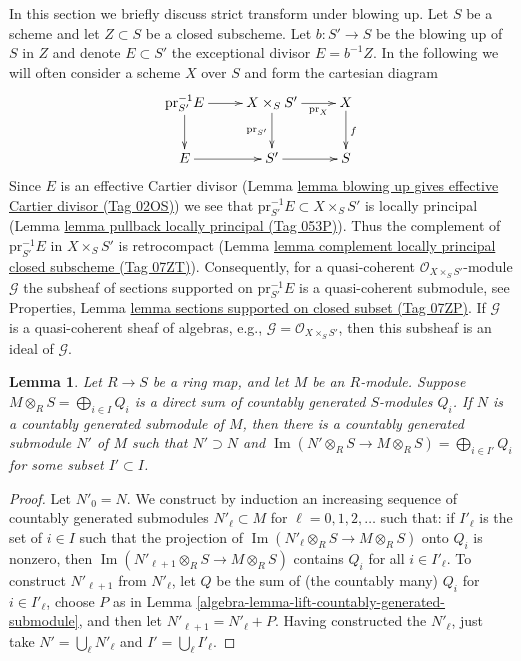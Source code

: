 \documentclass{amsart}
\theoremstyle{plain}
\newtheorem{lemma}[subsection]{Lemma}
\theoremstyle{definition}
\theoremstyle{remark}
\numberwithin{equation}{subsection}
\def\Im{\mathop{\mathrm{Im}}}
\begin{document}
\label{divisors-section-strict-transform}

\noindent
In this section we briefly discuss strict transform under blowing up.
Let $S$ be a scheme and let $Z \subset S$ be a closed subscheme.
Let $b : S' \to S$ be the blowing up of $S$ in $Z$ and denote $E \subset S'$
the exceptional divisor $E = b^{-1}Z$. In the following we will often
consider a scheme $X$ over $S$ and form the cartesian diagram
$$
\xymatrix{
\text{pr}_{S'}^{-1}E \ar[r] \ar[d] &
X \times_S S' \ar[r]_-{\text{pr}_X} \ar[d]_{\text{pr}_{S'}} &
X \ar[d]^f \\
E \ar[r] & S' \ar[r] & S
}
$$
Since $E$ is an effective Cartier divisor
(Lemma \href{https://stacks.math.columbia.edu/tag/02OS}{lemma blowing up gives effective Cartier divisor (Tag 02OS)})
we see that $\text{pr}_{S'}^{-1}E \subset X \times_S S'$
is locally principal
(Lemma \href{https://stacks.math.columbia.edu/tag/053P}{lemma pullback locally principal (Tag 053P)}).
Thus the complement of $\text{pr}_{S'}^{-1}E$ in $X \times_S S'$
is retrocompact
(Lemma \href{https://stacks.math.columbia.edu/tag/07ZT}{lemma complement locally principal closed subscheme (Tag 07ZT)}).
Consequently, for a quasi-coherent $\mathcal{O}_{X \times_S S'}$-module
$\mathcal{G}$ the subsheaf of sections supported on $\text{pr}_{S'}^{-1}E$
is a quasi-coherent submodule, see
Properties, Lemma \href{https://stacks.math.columbia.edu/tag/07ZP}{lemma sections supported on closed subset (Tag 07ZP)}.
If $\mathcal{G}$ is a quasi-coherent sheaf of algebras, e.g.,
$\mathcal{G} = \mathcal{O}_{X \times_S S'}$, then this subsheaf is an ideal
of $\mathcal{G}$.


\begin{lemma}
\label{algebra-lemma-adapted-submodule}
Let $R \to S$ be a ring map, and let $M$ be an $R$-module.  Suppose $M
\otimes_R S = \bigoplus_{i \in I} Q_i$ is a direct sum of countably generated
$S$-modules $Q_i$.  If $N$ is a countably generated submodule of $M$, then
there is a countably generated submodule $N'$ of $M$ such that $N' \supset N$
and $\Im(N' \otimes_R S \to M \otimes_R S) =
\bigoplus_{i \in I'} Q_i$ for some subset $I' \subset I$.
\end{lemma}

\begin{proof}
Let $N'_0 = N$.  We construct by induction an increasing sequence of countably
generated submodules $N'_{\ell} \subset M$ for $\ell = 0, 1, 2, \ldots$
such that: if $I'_{\ell}$ is the set of $i \in I$ such that the projection of
$\Im(N'_{\ell} \otimes_R S \to M \otimes_R S)$ onto $Q_i$ is
nonzero, then $\Im(N'_{\ell + 1} \otimes_R S \to M \otimes_R
S)$ contains $Q_i$ for all $i \in I'_{\ell}$.  To construct $N'_{\ell + 1}$
from $N'_\ell$, let $Q$ be the sum of (the countably many) $Q_i$ for
$i \in I'_{\ell}$, choose $P$ as in Lemma
\ref{algebra-lemma-lift-countably-generated-submodule}, and then let $N'_{\ell + 1} =
N'_{\ell} + P$.  Having constructed the $N'_{\ell}$, just take $N' =
\bigcup_{\ell} N'_{\ell}$ and $I' = \bigcup_{\ell} I'_{\ell}$.
\end{proof}
\end{document}
